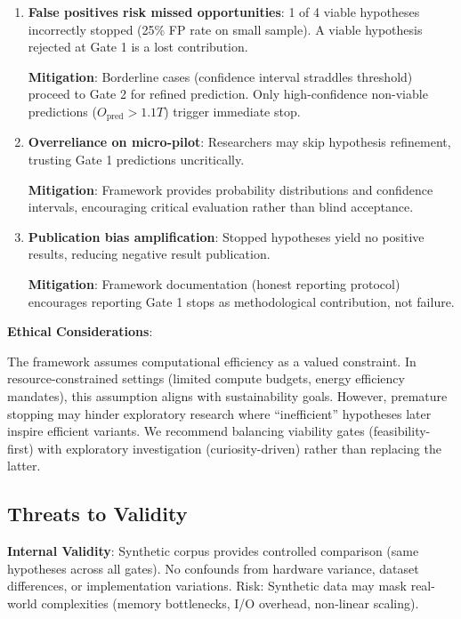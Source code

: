 \begin{enumerate}
\item \textbf{False positives risk missed opportunities}: 1 of 4 viable hypotheses incorrectly stopped (25\% FP rate on small sample). A viable hypothesis rejected at Gate 1 is a lost contribution.

   \textbf{Mitigation}: Borderline cases (confidence interval straddles threshold) proceed to Gate 2 for refined prediction. Only high-confidence non-viable predictions ($O_{\text{pred}} > 1.1T$) trigger immediate stop.

\item \textbf{Overreliance on micro-pilot}: Researchers may skip hypothesis refinement, trusting Gate 1 predictions uncritically.

   \textbf{Mitigation}: Framework provides probability distributions and confidence intervals, encouraging critical evaluation rather than blind acceptance.

\item \textbf{Publication bias amplification}: Stopped hypotheses yield no positive results, reducing negative result publication.

   \textbf{Mitigation}: Framework documentation (honest reporting protocol) encourages reporting Gate 1 stops as methodological contribution, not failure.
\end{enumerate}

\textbf{Ethical Considerations}:

The framework assumes computational efficiency as a valued constraint. In resource-constrained settings (limited compute budgets, energy efficiency mandates), this assumption aligns with sustainability goals. However, premature stopping may hinder exploratory research where ``inefficient'' hypotheses later inspire efficient variants. We recommend balancing viability gates (feasibility-first) with exploratory investigation (curiosity-driven) rather than replacing the latter.

\subsection{Threats to Validity}

\textbf{Internal Validity}: Synthetic corpus provides controlled comparison (same hypotheses across all gates). No confounds from hardware variance, dataset differences, or implementation variations. Risk: Synthetic data may mask real-world complexities (memory bottlenecks, I/O overhead, non-linear scaling).

